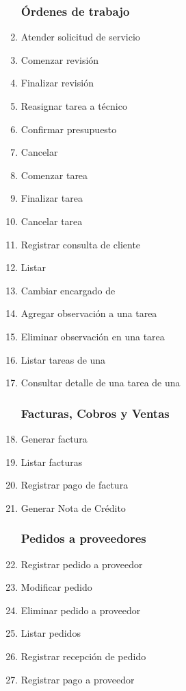 \documentclass[12pt]{extarticle}
\begin{document}
\begin{spacing}{1.2}
\begin{multicols}{2}
\begin{enumerate}
        \subsubsection*{Órdenes de trabajo}
			\item Atender solicitud de servicio            
            \item Comenzar revisión
            \item Finalizar revisión
            \item Reasignar tarea a técnico
            \item Confirmar presupuesto
            \item Cancelar \OT{}
            \item Comenzar tarea 
            \item Finalizar tarea
            \item Cancelar tarea
            \item Registrar consulta de cliente
            \item Listar \OTs{}
            \item Cambiar encargado de \OT{}
            \item Agregar observación a una tarea
            \item Eliminar observación en una tarea
            \item Listar tareas de una \OT{}
            \item Consultar detalle de una tarea de una \OT{}
        \subsubsection*{Facturas, Cobros y Ventas}
            \item Generar factura 
            \item Listar facturas
            \item Registrar pago de factura
            \item Generar Nota de Crédito
        \subsubsection*{Pedidos a proveedores}
            \item Registrar pedido a proveedor
            \item Modificar pedido 
            \item Eliminar pedido a proveedor
            \item Listar pedidos
            \item Registrar recepción de pedido
            \item Registrar pago a proveedor
    \end{enumerate}
    \end{multicols}


\end{spacing}
\end{document}
